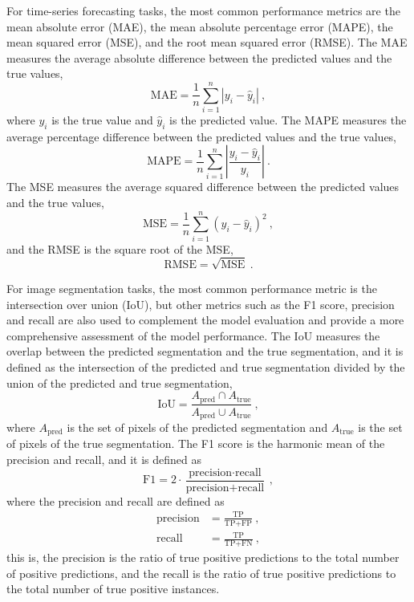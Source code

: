 For time-series forecasting tasks, the most common performance metrics are the
mean absolute error (MAE), the mean absolute percentage error (MAPE), the
mean squared error (MSE), and the root mean squared error (RMSE). The MAE
measures the average absolute difference between the predicted values and the
true values,
\begin{equation}
  \text{MAE} = \frac{1}{n}\sum_{i=1}^{n}|y_i - \hat{y}_i| \ ,
\end{equation}
where $y_i$ is the true value and $\hat{y}_i$ is the predicted value. The
MAPE
measures the average percentage difference between the predicted values and
the
true values,
\begin{equation}
  \text{MAPE} = \frac{1}{n}\sum_{i=1}^{n}\left|\frac{y_i -
    \hat{y}_i}{y_i}\right| \ .
\end{equation}
The MSE measures the average squared difference between the predicted values
and the true values,
\begin{equation}
  \text{MSE} = \frac{1}{n}\sum_{i=1}^{n}(y_i - \hat{y}_i)^2 \ ,
\end{equation}
and the RMSE is the square root of the MSE,
\begin{equation}
  \text{RMSE} = \sqrt{\text{MSE}} \ .
\end{equation}

For image segmentation tasks, the most common performance metric is the
intersection over union (IoU), but other metrics such as the F1 score,
precision and recall are also used to complement the model evaluation and
provide a more comprehensive assessment of the model performance. The IoU
measures the overlap between the predicted segmentation and the true
segmentation, and it is defined as the intersection of the predicted and true
segmentation divided by the union of the predicted and true segmentation,
\begin{equation}
  \text{IoU} = \frac{A_{\text{pred}} \cap A_{\text{true}}}{A_{\text{pred}}
    \cup
    A_{\text{true}}} \ ,
\end{equation}
where $A_{\text{pred}}$ is the set of pixels of the predicted segmentation
and
$A_{\text{true}}$ is the set of pixels of the true segmentation. The F1 score
is the harmonic mean of the precision and recall, and it is defined as
\begin{equation}
  \text{F1} =
  2\cdot\frac{\text{precision}\cdot\text{recall}}{\text{precision}
    +
    \text{recall}} \ ,
\end{equation}
where the precision and recall are defined as
\begin{align}
  \text{precision} & = \frac{\text{TP}}{\text{TP} + \text{FP}} \ , \\
  \text{recall}    & = \frac{\text{TP}}{\text{TP} + \text{FN}} \ ,
\end{align}
this is, the precision is the ratio of true positive predictions to the total
number of positive predictions, and the recall is the ratio of true positive
predictions to the total number of true positive instances.

